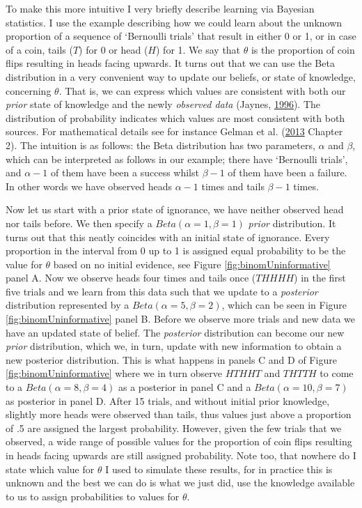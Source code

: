 \documentclass[openright,titlepage,12pt,a4paper]{book}
\begin{document}
To make this more intuitive I very briefly describe learning via Bayesian statistics. I use the example describing how we could learn about the unknown proportion of a sequence of `Bernoulli trials' that result in either 0 or 1, or in case of a coin, tails (\(T\)) for 0 or head (\(H\)) for 1. We say that \(\theta\) is the proportion of coin flips resulting in heads facing upwards. It turns out that we can use the Beta distribution in a very convenient way to update our beliefs, or state of knowledge, concerning \(\theta\). That is, we can express which values are consistent with both our \emph{prior} state of knowledge and the newly \emph{observed data} (Jaynes, \protect\hyperlink{ref-jaynes_bayesian_1996}{1996}). The distribution of probability indicates which values are most consistent with both sources. For mathematical details see for instance Gelman et al. (\protect\hyperlink{ref-gelman_bayesian_2013}{2013} Chapter 2). The intuition is as follows: the Beta distribution has two parameters, \(\alpha\) and \(\beta\), which can be interpreted as follows in our example; there have `Bernoulli trials', and \(\alpha - 1\) of them have been a success whilst \(\beta - 1\) of them have been a failure. In other words we have observed heads \(\alpha - 1\) times and tails \(\beta - 1\) times.

Now let us start with a prior state of ignorance, we have neither observed head nor tails before. We then specify a \(Beta(\alpha = 1, \beta = 1)\) \emph{prior} distribution. It turns out that this neatly coincides with an initial state of ignorance. Every proportion in the interval from 0 up to 1 is assigned equal probability to be the value for \(\theta\) based on no initial evidence, see Figure \ref{fig:binomUninformative} panel A. Now we observe heads four times and tails once (\(THHHH\)) in the first five trials and we learn from this data such that we update to a \emph{posterior} distribution represented by a \(Beta(\alpha = 5, \beta = 2)\), which can be seen in Figure \ref{fig:binomUninformative} panel B. Before we observe more trials and new data we have an updated state of belief. The \emph{posterior} distribution can become our new \emph{prior} distribution, which we, in turn, update with new information to obtain a new posterior distribution. This is what happens in panels C and D of Figure \ref{fig:binomUninformative} where we in turn observe \(HTHHT\) and \(THTTH\) to come to a \(Beta(\alpha = 8, \beta = 4)\) as a posterior in panel C and a \(Beta(\alpha = 10, \beta = 7)\) as posterior in panel D. After 15 trials, and without initial prior knowledge, slightly more heads were observed than tails, thus values just above a proportion of .5 are assigned the largest probability. However, given the few trials that we observed, a wide range of possible values for the proportion of coin flips resulting in heads facing upwards are still assigned probability. Note too, that nowhere do I state which value for \(\theta\) I used to simulate these results, for in practice this is unknown and the best we can do is what we just did, use the knowledge available to us to assign probabilities to values for \(\theta\).
\end{document}
